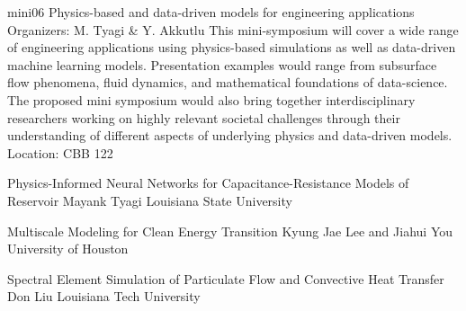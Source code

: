 \mini
{mini06}
{Physics-based and data-driven models for engineering applications}
{Organizers: M. Tyagi \& Y. Akkutlu}
{This mini-symposium will cover a wide range of engineering applications using physics-based simulations as well as data-driven machine learning models. Presentation examples would range from subsurface flow phenomena, fluid dynamics, and mathematical foundations of data-science. The proposed mini symposium would also bring together interdisciplinary researchers working on highly relevant societal challenges through their understanding of different aspects of underlying physics and data-driven models.}
{Location: CBB 122}

\begin{talks}
\item\talk
{Physics-Informed Neural Networks for Capacitance-Resistance Models of Reservoir}
{Mayank Tyagi}
{Louisiana State University}
\item\talk
{Multiscale Modeling for Clean Energy Transition}
{Kyung Jae Lee and Jiahui You}
{University of Houston}
\item\talk
{Spectral Element Simulation of Particulate Flow and Convective Heat Transfer}
{Don Liu}
{Louisiana Tech University}
\end{talks}
\room

